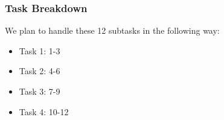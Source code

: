 \documentclass[pdftex,a4paper,11pt]{article}
\begin{document}
\subsubsection{Task Breakdown}
We plan to handle these 12 subtasks in the following way:

\begin{itemize}
  \item Task 1: 1-3 
  \item Task 2: 4-6
  \item Task 3: 7-9
  \item Task 4: 10-12
\end{itemize}
\end{document}
